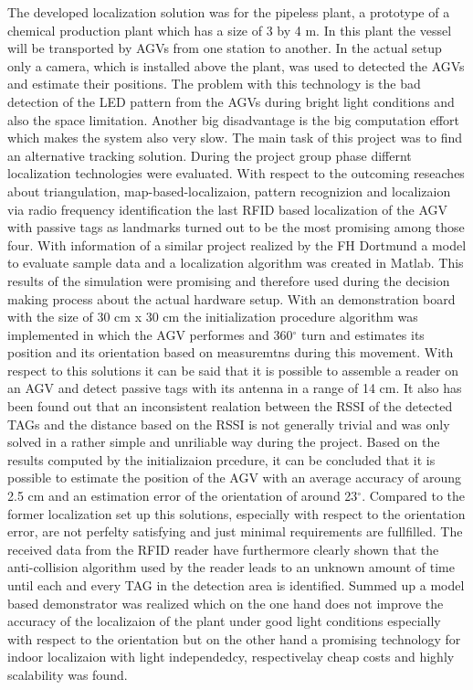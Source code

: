 The developed localization solution was for the pipeless plant, a prototype of a chemical production plant which has a size of 3 by 4 m. In this plant the vessel will be transported by AGVs from one station to another. In the actual setup only a camera, which is installed above the plant, was used to detected the AGVs and estimate their positions. The problem with this technology is the bad detection of the LED pattern from the AGVs during bright light conditions and also the space limitation. Another big disadvantage is the big computation effort which makes the system also very slow. The main task of this project was to find an alternative tracking solution. During the project group phase differnt localization technologies were evaluated. With respect to the outcoming reseaches about triangulation, map-based-localizaion, pattern recognizion and localizaion via radio frequency identification the last RFID based localization of the AGV with passive tags as landmarks turned out to be the most promising among those four. With information of a similar project realized by the FH Dortmund a model to evaluate sample data and a localization algorithm was created in Matlab. This results of the simulation were promising and  therefore used during the decision making process about the actual hardware setup. With an demonstration board with the size of 30 cm x 30 cm the initialization procedure algorithm was implemented in which the AGV performes and 360$^\circ$ turn and estimates its position and its orientation based on measuremtns during this movement. With respect to this solutions it can be said that it is possible to assemble a reader on an AGV and detect passive tags with its antenna in a range of 14 cm. It also has been found out that an inconsistent realation between the RSSI of the detected TAGs and the distance based on the RSSI is not generally trivial and was only solved in a rather simple and unriliable way during the project. Based on the results computed by the initializaion prcedure, it can be concluded that it is possible to estimate the position of the AGV with an average accuracy of aroung 2.5 cm and an estimation error of the orientation of around 23$^\circ$. Compared to the former localization set up this solutions, especially with respect to the orientation error, are not perfelty satisfying and just minimal requirements are fullfilled. The received data from the RFID reader have furthermore clearly shown that the anti-collision algorithm used by the reader leads to an unknown amount of time until each and every TAG in the detection area is identified. Summed up a model based demonstrator was realized which on the one hand does not improve the accuracy of the localizaion of the plant under good light conditions especially with respect to the orientation but on the other hand a promising technology for indoor localizaion with light independedcy, respectivelay cheap costs and highly scalability was found. 




